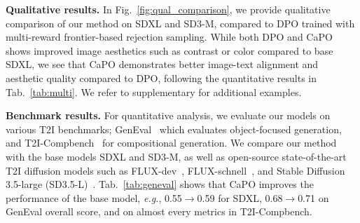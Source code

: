 \vspace{1mm}
\noindent
{\bf Qualitative results.}
In Fig.~\ref{fig:qual_comparison}, we provide qualitative comparison of our method on SDXL and SD3-M, compared to DPO trained with multi-reward frontier-based rejection sampling. 
While both DPO and CaPO shows improved image aesthetics such as contrast or color compared to base SDXL, we see that CaPO demonstrates better image-text alignment and aesthetic quality compared to DPO, following the quantitative results in Tab.~\ref{tab:multi}. We refer to supplementary for additional examples.





\vspace{1mm} 
\noindent
{\bf Benchmark results.}
For quantitative analysis, we evaluate our models on various T2I benchmarks; GenEval~\citep{ghosh2024geneval} which evaluates object-focused generation, and T2I-Compbench~\citep{huang2023t2i} for compositional generation.
We compare our method with the base models SDXL and SD3-M, as well as open-source state-of-the-art T2I diffusion models such as FLUX-dev~\citep{flux2024}, FLUX-schnell~\citep{flux2024}, and Stable Diffusion 3.5-large (SD3.5-L)~\citep{esser2024scaling}.
Tab.~\ref{tab:geneval} shows that CaPO improves the performance of the base model, \emph{e.g.}, 0.55$\rightarrow$0.59 for SDXL, 0.68$\rightarrow$0.71 on GenEval overall score, and on almost every metrics in T2I-Compbench. 



% 



